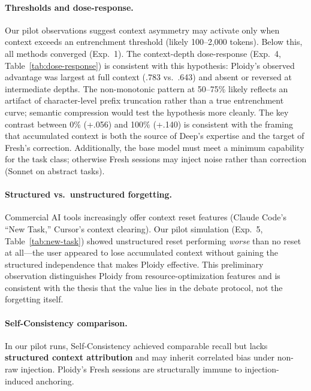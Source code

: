 \documentclass{article}
\begin{document}
\paragraph{Thresholds and dose-response.} Our pilot observations suggest context asymmetry may activate only when context exceeds an entrenchment threshold (likely 100--2,000 tokens). Below this, all methods converged (Exp.~1). The context-depth dose-response (Exp.~4, Table~\ref{tab:dose-response}) is consistent with this hypothesis: Ploidy's observed advantage was largest at full context (.783 vs.\ .643) and absent or reversed at intermediate depths. The non-monotonic pattern at 50--75\% likely reflects an artifact of character-level prefix truncation rather than a true entrenchment curve; semantic compression would test the hypothesis more cleanly. The key contrast between 0\% (+.056) and 100\% (+.140) is consistent with the framing that accumulated context is both the source of Deep's expertise and the target of Fresh's correction. Additionally, the base model must meet a minimum capability for the task class; otherwise Fresh sessions may inject noise rather than correction (Sonnet on abstract tasks).

\paragraph{Structured vs.\ unstructured forgetting.} Commercial AI tools increasingly offer context reset features (Claude Code's ``New Task,'' Cursor's context clearing). Our pilot simulation (Exp.~5, Table~\ref{tab:new-task}) showed unstructured reset performing \emph{worse} than no reset at all---the user appeared to lose accumulated context without gaining the structured independence that makes Ploidy effective. This preliminary observation distinguishes Ploidy from resource-optimization features and is consistent with the thesis that the value lies in the debate protocol, not the forgetting itself.

\paragraph{Self-Consistency comparison.} In our pilot runs, Self-Consistency achieved comparable recall but lacks \textbf{structured context attribution} and may inherit correlated bias under non-raw injection. Ploidy's Fresh sessions are structurally immune to injection-induced anchoring.
\end{document}
